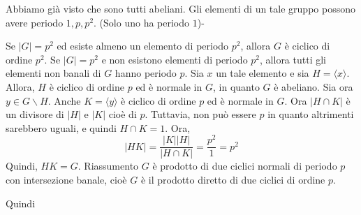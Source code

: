 \documentclass[a4paper]{article}
\begin{document}
Abbiamo già visto che sono tutti abeliani.
Gli elementi di un tale gruppo possono avere periodo \(1, p, p^2\). (Solo uno ha periodo \(1\))-

Se \(|G| = p^2\) ed esiste almeno un elemento di periodo
\(p^2\), allora \(G\) è ciclico di ordine \(p^2\).
Se \(|G| = p^2\) e non esistono elementi di periodo \(p^2\),
allora tutti gli elementi non banali di \(G\) hanno periodo \(p\).
Sia \(x\) un tale elemento e sia \(H = \langle x \rangle\).
Allora, \(H\) è ciclico di ordine \(p\) ed è normale in \(G\), in quanto \(G\) è abeliano.
Sia ora \(y \in G \backslash H\). Anche \(K = \langle y \rangle\)
è ciclico di ordine \(p\) ed è normale in \(G\).
Ora \(|H \cap K|\) è un divisore di \(|H|\) e \(|K|\)
cioè di \(p\). Tuttavia, non può essere \(p\) in quanto altrimenti sarebbero uguali,
e quindi \(H \cap K = 1\).
Ora,
\[
    |HK| = \frac{|K||H|}{|H \cap K|} = \frac{p^2}{1} = p^2
\]
Quindi, \(HK = G\).
Riassumento \(G\) è prodotto di due ciclici normali
di periodo \(p\) con intersezione banale,
cioè \(G\) è il prodotto diretto di due ciclici di ordine \(p\).

Quindi
\end{document}

